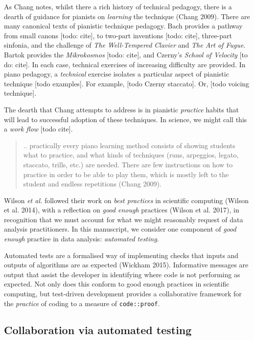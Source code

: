 \documentclass[
]{article}
\begin{document}
As Chang notes, whilst there a rich history of technical pedagogy, there
is a dearth of guidance for pianists on \emph{learning} the technique
(Chang 2009). There are many canonical texts of pianistic technique
pedagogy. Bach provides a pathway from small canons {[}todo: cite{]}, to
two-part inventions {[}todo: cite{]}, three-part sinfonia, and the
challenge of \emph{The Well-Tempered Clavier} and \emph{The Art of
Fugue}. Bartok provides the \emph{Mikrokosmos} {[}todo: cite{]}, and
Czerny's \emph{School of Velocity} {[}to do: cite{]}. In each case,
technical exercises of increasing difficulty are provided. In piano
pedagogy, a \emph{technical} exercise isolates a particular aspect of
pianistic technique {[}todo examples{]}. For example, {[}todo Czerny
staccato{]}. Or, {[}todo voicing technique{]}.

The dearth that Chang attempts to address is in pianistic
\emph{practice} habits that will lead to successful adoption of these
techniques. In science, we might call this a \emph{work flow} {[}todo
cite{]}.

\begin{quote}
.. practically every piano learning method consists of showing students
what to practice, and what kinds of techniques (runs, arpeggios, legato,
staccato, trills, etc.) are needed. There are few instructions on how to
practice in order to be able to play them, which is mostly left to the
student and endless repetitions (Chang 2009).
\end{quote}

Wilson \emph{et al.} followed their work on \emph{best practices} in
scientific computing (Wilson et al. 2014), with a reflection on
\emph{good enough} practices (Wilson et al. 2017), in recognition that
we must account for what we might reasonably request of data analysis
practitioners. In this manuscript, we consider one component of
\emph{good enough} practice in data analysis: \emph{automated testing}.

Automated tests are a formalised way of implementing checks that inputs
and outputs of algorithms are as expected (Wickham 2015). Informative
messages are output that assist the developer in identifying where code
is not performing as expected. Not only does this conform to good enough
practices in scientific computing, but test-driven development provides
a collaborative framework for the \emph{practice} of coding to a measure
of \texttt{code::proof}.

\hypertarget{collaboration-via-automated-testing}{%
\subsection{Collaboration via automated
testing}\label{collaboration-via-automated-testing}}
\end{document}
